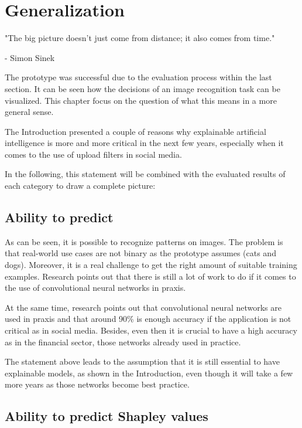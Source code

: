 
\chapter{Generalization}
\label{ch:generalization}
\epigraph{"The big picture doesn't just come from distance; it also comes from time."}{- Simon Sinek}

The prototype was successful due to the evaluation process within the last section. It can be seen how the decisions of an image recognition task can be visualized. This chapter focus on the question of what this means in a more general sense. 

The Introduction presented a couple of reasons why explainable artificial intelligence is more and more critical in the next few years, especially when it comes to the use of upload filters in social media. 

In the following, this statement will be combined with the evaluated results of each category to draw a complete picture:

\section{Ability to predict}

As can be seen, it is possible to recognize patterns on images. The problem is that real-world use cases are not binary as the prototype assumes (cats and dogs). Moreover, it is a real challenge to get the right amount of suitable training examples. Research points out that there is still a lot of work to do if it comes to the use of convolutional neural networks in praxis.

At the same time, research points out that convolutional neural networks are used in praxis and that around 90\% is enough accuracy if the application is not critical as in social media. Besides, even then it is crucial to have a high accuracy as in the financial sector, those networks already used in practice. 

The statement above leads to the assumption that it is still essential to have explainable models, as shown in the Introduction, even though it will take a few more years as those networks become best practice. 

\section{Ability to predict Shapley values}


